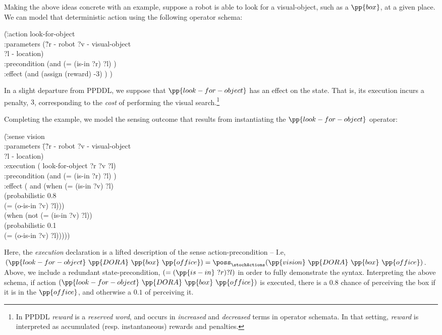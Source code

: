 Making the above ideas concrete with an example, suppose a robot is
able to look for a visual-object, such as a $\pp{box}$, at a given place. We
can model that deterministic action using the following operator
schema:


\small
\begin{tabtt}
(\=:action look-for-object \+ \\
   :parameters (\=?r - robot ?v - visual-object\\
   \> ?l - location) \\
   :precondition (and (= (is-in ?r) ?l) ) \\
   :effect (and (assign (reward) -3) ) ) \\
\end{tabtt}
\normalsize


\noindent In a slight departure from PPDDL, we suppose that
$\pp{look-for-object}$ has an effect on the state. That is, its
execution incurs a penalty, $3$, corresponding to the {\em cost} of
performing the visual search.\footnote{In PPDDL {\em reward} is a {\em
reserved word}, and occurs in {\em increased} and {\em decreased}
terms in operator schemata. In that setting, {\em reward} is
interpreted as accumulated (resp. instantaneous) rewards and
penalties.}

Completing the example, we model the sensing outcome that results from
instantiating the $\pp{look-for-object}$ operator:

\small
\begin{tabtt}
(\= :sense vision \+\\
 :parameters \= (\= ?r - robot ?v - visual-object\\
 \>\>  ?l - location) \\
 :execution \> ( \> look-for-object ?r ?v ?l) \\
 :precondition (and (= (is-in ?r) ?l) ) \\
 :effect \>  (  \> and (when (= (is-in ?v) ?l) \\
   \> \> (probabilistic 0.8 \\
   \>  \>(= (o-is-in ?v) ?l))) \\
  \> (when (not (= (is-in ?v) ?l)) \\
   \>  \> (probabilistic 0.1 \\
   \>  \> (= (o-is-in ?v) ?l))))) \\
\end{tabtt}
\normalsize


\noindent Here, the {\em execution} declaration is a lifted description of
the sense action-precondition -- I.e,
$(\pp{look-for-object}~\pp{DORA}~\pp{box}~\pp{office}) =
\poss_\stochActions(\pp{vision}~\pp{DORA}~\pp{box}~\pp{office})$. Above,
we include a redundant state-precondition, $(=(\pp{is-in}~?r)?l)$ in
order to fully demonstrate the syntax. Interpreting the above schema,
if action $(\pp{look-for-object}~\pp{DORA}~\pp{box}~\pp{office})$ is
executed, there is a $0.8$ chance of perceiving the box if it is in
the $\pp{office}$, and otherwise a $0.1$ of perceiving it.

